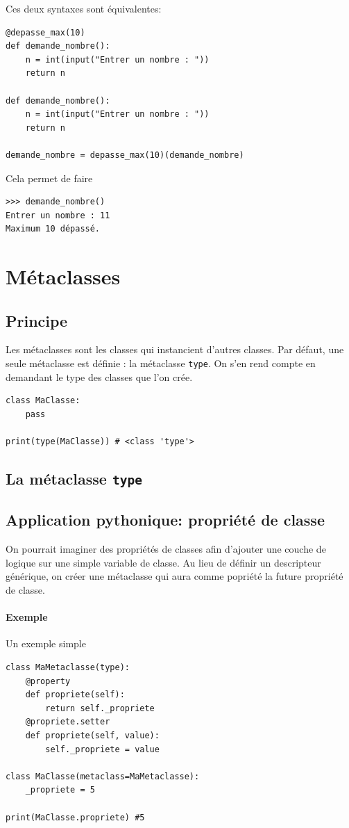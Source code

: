 \documentclass[a4paper, 10pt]{article}
\begin{document}
Ces deux syntaxes sont équivalentes:

\begin{verbatim}
@depasse_max(10)
def demande_nombre():
    n = int(input("Entrer un nombre : "))
    return n

def demande_nombre():
    n = int(input("Entrer un nombre : "))
    return n

demande_nombre = depasse_max(10)(demande_nombre)
\end{verbatim}

Cela permet de faire

\begin{Verbatim}[frame=single, fontsize=\footnotesize]
>>> demande_nombre()
Entrer un nombre : 11
Maximum 10 dépassé.
\end{Verbatim}

\section{Métaclasses}
\subsection{Principe}
\label{sec:metaclasses}
Les métaclasses sont les classes qui instancient d'autres classes. Par défaut, une seule métaclasse est définie : la métaclasse \texttt{type}. On s'en rend compte en demandant le type des classes que l'on crée.

\begin{verbatim}
class MaClasse:
    pass

print(type(MaClasse)) # <class 'type'>
\end{verbatim}

\subsection{La métaclasse \texttt{type}}

\subsection{Application pythonique: propriété de classe}
On pourrait imaginer des propriétés de classes afin d'ajouter une couche de logique sur une simple variable de classe. Au lieu de définir un descripteur générique, on créer une métaclasse qui aura comme popriété la future propriété de classe.

\paragraph{Exemple} Un exemple simple
\begin{verbatim}
class MaMetaclasse(type):
    @property
    def propriete(self):
        return self._propriete
    @propriete.setter
    def propriete(self, value):
        self._propriete = value

class MaClasse(metaclass=MaMetaclasse):
    _propriete = 5

print(MaClasse.propriete) #5
\end{verbatim}
\end{document}
